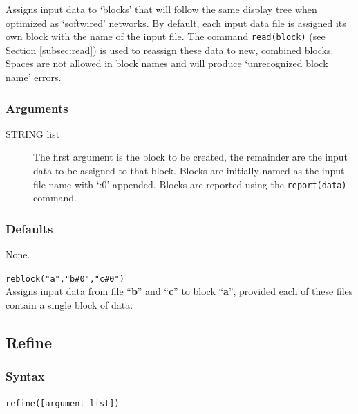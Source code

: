 	\begin{phygdescription}
		{Assigns input data to `blocks' that will follow the same display tree when optimized
		as `softwired' networks. By default, each input data file is assigned its own block with 
		the name of the input file. The command \texttt{read(block)} (see Section \ref{subsec:read}) 
		is used to reassign these data to new, combined blocks. Spaces are not allowed in 
		block names and will produce `unrecognized block name' errors.} 
	\end{phygdescription}
	
	\subsubsection{Arguments}
	\begin{description}
	
		\item [STRING list] The first argument is the block to be created, the remainder 
		are the input data to be assigned to that block. Blocks are initially named as the input 
		file name with `:0' appended. Blocks are reported using the \texttt{report(data)} command.
		
	\end{description}

	\subsubsection{Defaults}
		None.
	
	\begin{example}

		\item{\texttt{reblock("a","b\#0","c\#0")}\\ Assigns input data from file ``\textbf{b}'' and 
		``\textbf{c}'' to block ``\textbf{a}'', provided each of these files contain a single block 
		of data.}
	
	\end{example}

\subsection{Refine}
\label{subsec:refine}
	\subsubsection{Syntax}
		\texttt{refine([argument list])}
		

